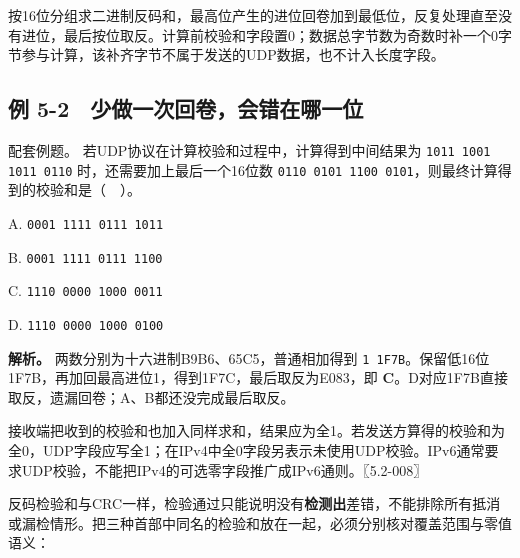 按16位分组求二进制反码和，最高位产生的进位回卷加到最低位，反复处理直至没有进位，最后按位取反。计算前校验和字段置0；数据总字节数为奇数时补一个0字节参与计算，该补齐字节不属于发送的UDP数据，也不计入长度字段。

\subsection{例 5-2　少做一次回卷，会错在哪一位}\label{CN05-ex2}

\begin{example}[配套例题]

配套例题。 若UDP协议在计算校验和过程中，计算得到中间结果为 \texttt{1011 1001 1011 0110} 时，还需要加上最后一个16位数 \texttt{0110 0101 1100 0101}，则最终计算得到的校验和是（　）。

A. \texttt{0001 1111 0111 1011}

B. \texttt{0001 1111 0111 1100}

C. \texttt{1110 0000 1000 0011}

D. \texttt{1110 0000 1000 0100}

\end{example}

\textbf{解析。} 两数分别为十六进制B9B6、65C5，普通相加得到 \texttt{1 1F7B}。保留低16位1F7B，再加回最高进位1，得到1F7C，最后取反为E083，即 \textbf{C}。D对应1F7B直接取反，遗漏回卷；A、B都还没完成最后取反。

接收端把收到的校验和也加入同样求和，结果应为全1。若发送方算得的校验和为全0，UDP字段应写全1；在IPv4中全0字段另表示未使用UDP校验。IPv6通常要求UDP校验，不能把IPv4的可选零字段推广成IPv6通则。〖5.2-008〗

反码检验和与CRC一样，检验通过只能说明没有\textbf{检测出}差错，不能排除所有抵消或漏检情形。把三种首部中同名的检验和放在一起，必须分别核对覆盖范围与零值语义：

